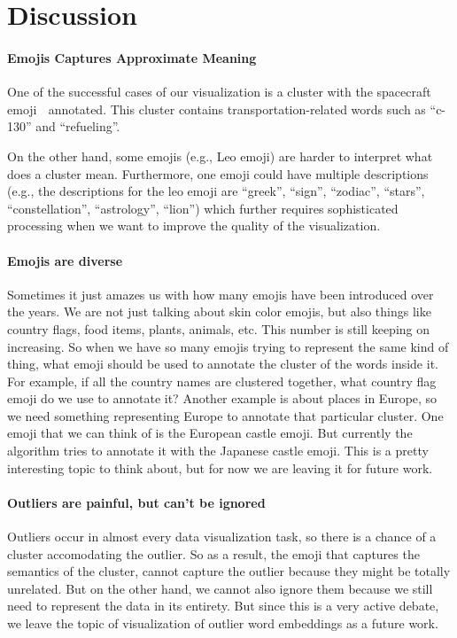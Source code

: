 \section{Discussion}
\label{sec:discussion}

\paragraph{\bf Emojis Captures Approximate Meaning} 
One of the successful cases of our visualization is a cluster with the spacecraft emoji 🚀 annotated. This cluster contains transportation-related words such as ``c-130'' and ``refueling''. 

On the other hand, some emojis (e.g., Leo emoji) are harder to interpret what does a cluster mean. 
Furthermore, one emoji could have multiple descriptions (e.g., the descriptions for the leo emoji are ``greek'', ``sign'', ``zodiac'', ``stars'', ``constellation'', ``astrology'', ``lion'') which further requires sophisticated processing when we want to improve the quality of the visualization. 

\paragraph{Emojis are diverse} 
Sometimes it just amazes us with how many emojis have been introduced over the years. We are not just talking about skin color emojis, but also things like country flags, food items, plants, animals, etc. This number is still keeping on increasing. So when we have so many emojis trying to represent the same kind of thing, what emoji should be used to annotate the cluster of the words inside it. For example, if all the country names are clustered together, what country flag emoji do we use to annotate it? Another example is about places in Europe, so we need something representing Europe to annotate that particular cluster. One emoji that we can think of is the European castle emoji. But currently the algorithm tries to annotate it with the Japanese castle emoji. This is a pretty interesting topic to think about, but for now we are leaving it for future work.

\paragraph{Outliers are painful, but can't be ignored} 
Outliers occur in almost every data visualization task, so there is a chance of a cluster accomodating the outlier. So as a result, the emoji that captures the semantics of the cluster, cannot capture the outlier because they might be totally unrelated. But on the other hand, we cannot also ignore them because we still need to represent the data in its entirety. But since this is a very active debate, we leave the topic of visualization of outlier word embeddings as a future work. 

